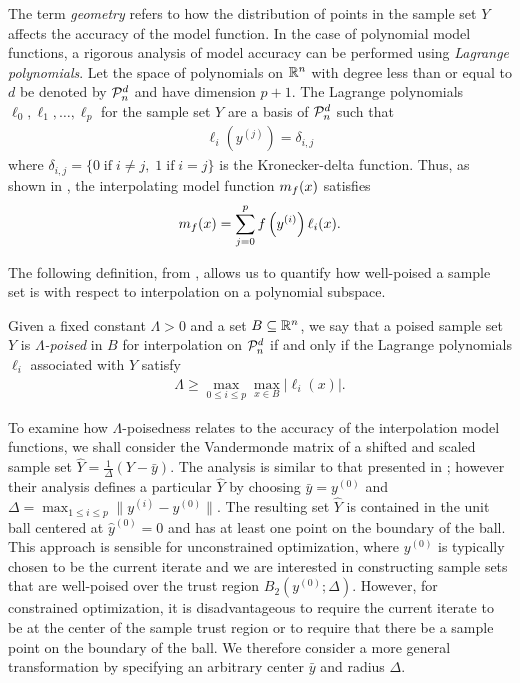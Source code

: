 \documentclass{article}
\begin{document}
\label{geometry}
The term \emph{geometry} refers to  how the distribution of points in the sample set $Y$ affects the accuracy of the model function.     In the case of polynomial model functions, a rigorous analysis of model accuracy can be performed using \emph{Lagrange polynomials}.
Let the space of polynomials on $\mathbb R^n$ with degree less than or equal to $d$ be denoted by $\mathcal{P}^d_n$ and have dimension $p+1$.
The Lagrange polynomials $\ell_0, \ell_1, \ldots, \ell_p$ for the sample set $Y$ are a basis of $\mathcal{P}^d_n$ such that
\begin{align}
\ell_i\left(y^{(j)}\right) = \delta_{i,j}  \label{interpolation_condition_lagrange}
\end{align}
where $\delta_{i,j} = \{0 \;\text{if}\; i\ne j,\; 1 \;\text{if} \; i = j \}$ is the Kronecker-delta function.
Thus, as shown in \cite{introduction_book},  the interpolating model function ${{m}_f}(x)$ 
satisfies
\begin{align}
\label{reg} 
{{m}_f}(x) = \sum^p_{j=0}f\left(y^{(i)}\right)\ell_i(x).
\end{align}

The following definition, from \cite[Definition 3.6]{introduction_book},  allows us to quantify how well-poised a sample set is with respect to interpolation on a polynomial subspace.

\begin{definition}
\label{lambda-poised}
Given a fixed constant $\Lambda>0$ and a set $B \subseteq \mathbb R^n$, we say that a poised sample set $Y$ is \emph{$\Lambda$-poised} in $B$ for interpolation on $\mathcal{P}^d_n$
if and only if the Lagrange polynomials $\ell_i$ associated with $Y$ satisfy
\begin{align}
\Lambda \ge \max_{0\le i\le p}\max_{x\in B}|\ell_i(x)|.
\end{align}
\end{definition}

To examine how $\Lambda$-poisedness relates to the accuracy of the interpolation model functions, we shall consider the Vandermonde matrix of a shifted and scaled sample set $\hat{Y} = \frac{1}{\Delta}(Y-\bar{y})$.  The analysis is similar to that presented in \cite{introduction_book}; however their analysis defines a particular  $\hat{Y}$ by choosing $\bar{y} = y^{(0)}$ and $\Delta = \max_{1 \le i \le p} \| y^{(i)}-y^{(0)}\|$.  The resulting set $\hat{Y}$  is contained in the unit ball centered at $\hat{y}^{(0)} = 0$ and has at least one point on the boundary of the ball.    This approach is sensible for unconstrained optimization, where  $y^{(0)}$ is typically chosen to be the current iterate and we are interested in constructing sample sets that are well-poised over the trust region $B_2(y^{(0)};\Delta)$.    However, for constrained optimization,  it is disadvantageous to require the current iterate to be at the center of the sample trust region or to require that there be a sample point on the boundary of the ball.   We therefore consider a more general transformation by specifying an arbitrary center $\bar{y}$ and radius $\Delta$.  
\end{document}
